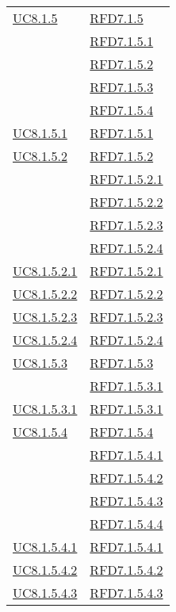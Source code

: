 \begin{longtable}{|>{\centering}m{5cm}|m{5cm}<{\centering}|}
\hyperref[UC8.1.5]{UC8.1.5} & \hyperlink{RFD7.1.5}{RFD7.1.5}\\
& \hyperlink{RFD7.1.5.1}{RFD7.1.5.1}\\
& \hyperlink{RFD7.1.5.2}{RFD7.1.5.2}\\
& \hyperlink{RFD7.1.5.3}{RFD7.1.5.3}\\
& \hyperlink{RFD7.1.5.4}{RFD7.1.5.4}\\ \hline
\hyperref[UC8.1.5.1]{UC8.1.5.1} & \hyperlink{RFD7.1.5.1}{RFD7.1.5.1}\\ \hline
\hyperref[UC8.1.5.2]{UC8.1.5.2} & \hyperlink{RFD7.1.5.2}{RFD7.1.5.2}\\
& \hyperlink{RFD7.1.5.2.1}{RFD7.1.5.2.1}\\
& \hyperlink{RFD7.1.5.2.2}{RFD7.1.5.2.2}\\
& \hyperlink{RFD7.1.5.2.3}{RFD7.1.5.2.3}\\
& \hyperlink{RFD7.1.5.2.4}{RFD7.1.5.2.4}\\ \hline
\hyperref[UC8.1.5.2.1]{UC8.1.5.2.1} & \hyperlink{RFD7.1.5.2.1}{RFD7.1.5.2.1}\\ \hline
\hyperref[UC8.1.5.2.2]{UC8.1.5.2.2} & \hyperlink{RFD7.1.5.2.2}{RFD7.1.5.2.2}\\ \hline
\hyperref[UC8.1.5.2.3]{UC8.1.5.2.3} & \hyperlink{RFD7.1.5.2.3}{RFD7.1.5.2.3}\\ \hline
\hyperref[UC8.1.5.2.4]{UC8.1.5.2.4} & \hyperlink{RFD7.1.5.2.4}{RFD7.1.5.2.4}\\ \hline
\hyperref[UC8.1.5.3]{UC8.1.5.3} & \hyperlink{RFD7.1.5.3}{RFD7.1.5.3}\\
& \hyperlink{RFD7.1.5.3.1}{RFD7.1.5.3.1}\\ \hline
\hyperref[UC8.1.5.3.1]{UC8.1.5.3.1} & \hyperlink{RFD7.1.5.3.1}{RFD7.1.5.3.1}\\ \hline
\hyperref[UC8.1.5.4]{UC8.1.5.4} & \hyperlink{RFD7.1.5.4}{RFD7.1.5.4}\\
& \hyperlink{RFD7.1.5.4.1}{RFD7.1.5.4.1}\\
& \hyperlink{RFD7.1.5.4.2}{RFD7.1.5.4.2}\\
& \hyperlink{RFD7.1.5.4.3}{RFD7.1.5.4.3}\\
& \hyperlink{RFD7.1.5.4.4}{RFD7.1.5.4.4}\\ \hline
\hyperref[UC8.1.5.4.1]{UC8.1.5.4.1} & \hyperlink{RFD7.1.5.4.1}{RFD7.1.5.4.1}\\ \hline
\hyperref[UC8.1.5.4.2]{UC8.1.5.4.2} & \hyperlink{RFD7.1.5.4.2}{RFD7.1.5.4.2}\\ \hline
\hyperref[UC8.1.5.4.3]{UC8.1.5.4.3} & \hyperlink{RFD7.1.5.4.3}{RFD7.1.5.4.3}\\ \hline

\end{longtable}
